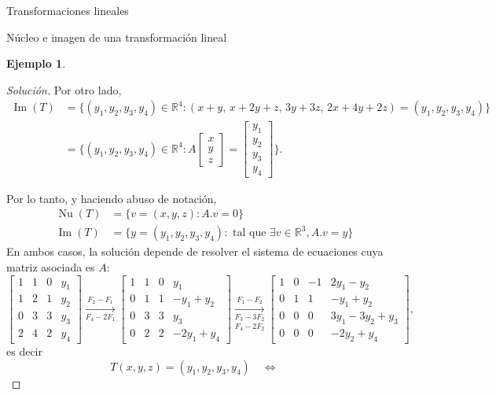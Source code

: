 \documentclass[a4paper,12pt,twoside,spanish,reqno]{amsbook}
\theoremstyle{definition}
\newtheorem{ejemplo}{Ejemplo}[section]
\theoremstyle{remark}
\newcommand{\img}{\operatorname{Im}}
\newcommand{\nuc}{\operatorname{Nu}}
\newcommand{\R}{\mathbb R}
\begin{document}
\begin{chapter}{Transformaciones lineales}
\begin{section}{Núcleo e imagen de una transformación lineal}
\begin{ejemplo}
\begin{proof}[Solución]
		Por  otro lado,
		\begin{align*}
		\img(T) &= \{(y_1,y_2,y_3,y_4)\in \R^4: (x +y ,\,x +2y +z,\,3y +3z,\,2x +4y +2z) =(y_1,y_2,y_3,y_4)\}\\
		&=  \{(y_1,y_2,y_3,y_4)\in \R^4: A\begin{bmatrix}x\\y\\z	\end{bmatrix}  =
		\begin{bmatrix}y_1\\y_2\\y_3\\y_4\end{bmatrix}\}.
		\end{align*}
		
		
		Por lo tanto, y haciendo abuso de notación,  
		\begin{align*}
		\nuc(T) &= \{v=(x,y,z):   A.{v}=0\}\\
		\img(T) &= \{y= (y_1,y_2,y_3,y_4): \text{ tal que } \exists v \in \R^3, A.{v} = {y}  \}
		\end{align*}
		En  ambos casos, la solución depende de resolver el sistema de ecuaciones cuya matriz asociada es $A$:
		\begin{equation*}
		\left[\begin{array}{rrr|r}1&1&0&y_1\\1&2&1&y_2\\0&3&3&y_3\\2&4&2&y_4 \end{array}\right]
		\underset{F_4-2F_1}{\stackrel{F_2 -F_1}{\longrightarrow}} 
		\left[\begin{array}{rrr|r}1&1&0&y_1\\0&1&1&-y_1+y_2\\0&3&3&y_3\\0&2&2&-2y_1 +y_4 \end{array}\right]
		\underset{F_4-2F_2}{\underset{F_3-3F_2}{\stackrel{F_1 -F_2}{\longrightarrow}} }
		\left[\begin{array}{rrr|r}1&0&-1&2y_1-y_2\\0&1&1&-y_1+y_2\\0&0&0&3y_1-3y_2+y_3\\0&0&0&-2y_2 +y_4 \end{array}\right],
		\end{equation*}
		es decir
		\begin{equation}\label{eq-gen}
		T(x,y,z) = (y_1,y_2,y_3,y_4) \quad\Leftrightarrow \quad
		\begin{array}{rl}

\end{array}
\end{equation}
\end{proof}
\end{ejemplo}
\end{section}
\end{chapter}
\end{document}

